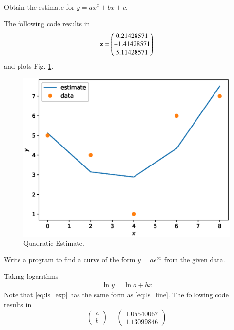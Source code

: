 \documentclass[journal,12pt,twocolumn]{IEEEtran}
\begin{document}
\begin{problem}
Obtain the estimate for $y = ax^2 + bx + c$.
\end{problem}
\solution The following code results in
\begin{equation}
\mathbf{z} =
\begin{pmatrix}
 0.21428571
 \\
 -1.41428571
 \\
  5.11428571
\end{pmatrix} 
\end{equation}
%
and plots Fig. \ref{fig:ls_quad}.

\begin{figure}[!h]
\centering
\includegraphics[width=\columnwidth]{./figs/ls_quad.eps}
\caption{Quadratic Estimate.}
\label{fig:ls_quad}
\end{figure}
%
\begin{problem}
Write a program to find a curve of the form $y = ae^{bx}$ from the given
data.
\end{problem}
\solution Taking logarithms,
\begin{align}
\label{eq:ls_exp}
\ln y = \ln a + bx
\end{align}
\solution
Note that \eqref{eq:ls_exp} has the same form as \eqref{eq:ls_line}. The following code results in
\begin{equation}
\begin{pmatrix}
a
\\
b
\end{pmatrix}
= \begin{pmatrix}
1.05540067 \\ 1.13099846
\end{pmatrix} 
\end{equation}
\end{document}
